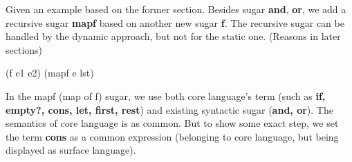 Given an example based on the former section. Besides sugar {\bfseries and}, {\bfseries or}, we add a recursive sugar {\bfseries mapf} based on another new sugar {\bfseries f}. The recursive sugar can be handled by the dynamic approach, but not for the static one. (Reasons in later sections)
\begin{Codes}
\small{(f e1 e2)} 
\small{(mapf e lst)}  
\end{Codes}

In the mapf (map of f) sugar, we use both core language's term (such as {\bfseries if, empty?, cons, let, first, rest}) and existing syntactic sugar ({\bfseries and, or}). The semantics of core language is as common. But to show some exact step, we set the term {\bfseries cons} as a common expression (belonging to core language, but being displayed as surface language).


